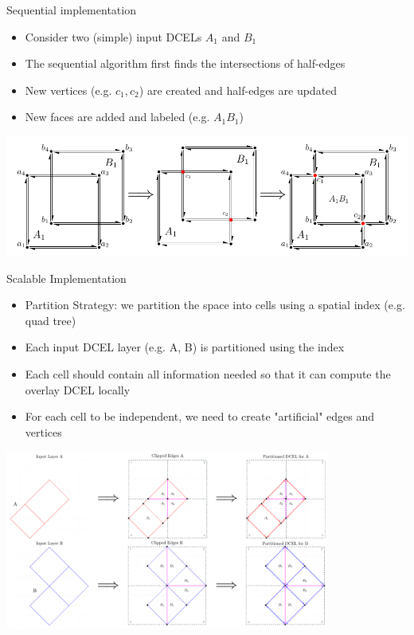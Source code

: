 \documentclass{beamer}
\begin{document}
    \begin{frame}{Sequential implementation}
     \begin{itemize}
            \item Consider two (simple) input DCELs $A_1$ and $B_1$
            \item The sequential algorithm first finds the intersections of half-edges
            \item New vertices (e.g. $c_1, c_2$) are created and half-edges are updated
            \item New faces are added and labeled (e.g. $A_1B_1$)
    \end{itemize}     
    
        \centering
        \includegraphics[width=\textwidth]{figures/dcel_seq}
    \end{frame}
    
    \begin{frame}{Scalable Implementation}
    \begin{itemize}
    \small
            \item Partition Strategy: we partition the space into cells using a spatial index (e.g. quad tree)
            \item Each input DCEL layer (e.g. A, B) is partitioned using the index
            \item Each cell should contain all information needed so that it can compute the overlay DCEL locally
            \item For each cell to be independent, we need to create "artificial" edges and vertices
            
    \end{itemize}    
        \centering
        \includegraphics[width=0.8\textwidth]{figures/partition_strategy}
    \end{frame}
\end{document}

